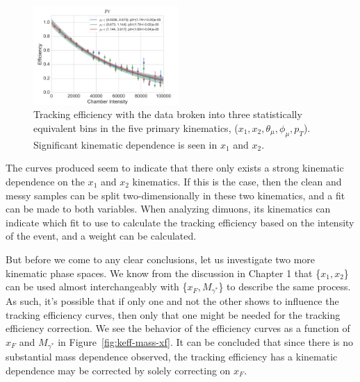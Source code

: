 \begin{figure}
\includegraphics[width=0.49\textwidth]{figures/analysis/pt-keff-int.png} \vspace{10px}
\caption{Tracking efficiency with the data broken into three statistically equivalent bins in the five primary kinematics, ($x_1, x_2, \theta_\mu, \phi_\mu, p_T$). Significant kinematic dependence is seen in $x_1$ and $x_2$.}
\label{fig:keff-all-kin}
\end{figure}
The curves produced seem to indicate that there only exists a strong kinematic dependence on the $x_1$ and $x_2$ kinematics. If this is the case, then the clean and messy samples can be split two-dimensionally in these two kinematics, and a fit can be made to both variables. When analyzing dimuons, its kinematics can indicate which fit to use to calculate the tracking efficiency based on the intensity of the event, and a weight can be calculated.

But before we come to any clear conclusions, let us investigate two more kinematic phase spaces. We know from the discussion in Chapter 1 that \{$x_1, x_2$\} can be used almost interchangeably with \{$x_F, M_{\gamma^*}$\} to describe the same process. As such, it's possible that if only one and not the other shows to influence the tracking efficiency curves, then only that one might be needed for the tracking efficiency correction. We see the behavior of the efficiency curves as a function of $x_F$ and $M_{\gamma^*}$ in Figure~\ref{fig:keff-mass-xf}. It can be concluded that since there is no substantial mass dependence observed, the tracking efficiency has a kinematic dependence may be corrected by solely correcting on $x_F$.

